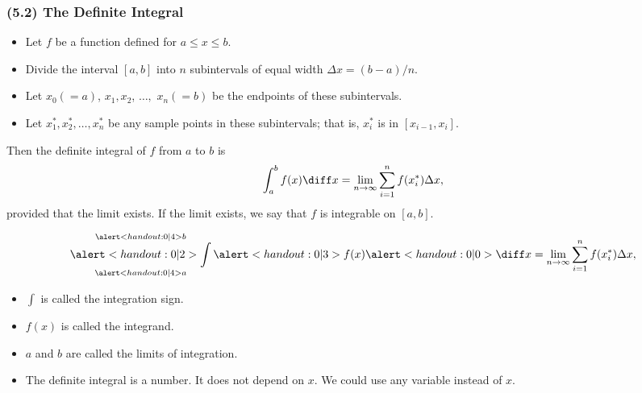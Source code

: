 \begin{frame}\frametitle{(5.2) The Definite Integral}
\begin{definition}
\begin{itemize}
\item  Let $f$ be a function defined for $a\leq x\leq b$.
\item  Divide the interval $[a,b]$ into $n$ subintervals of equal width $\Delta x = (b-a)/n$.  
\item  Let $x_0 (=a)$, $x_1, x_2$, $\ldots ,$ $x_n (=b)$ be the endpoints of these subintervals.
\item  Let $x_1^*, x_2^*, \ldots , x_n^*$ be any sample points in these subintervals; that is, $x_i^*$ is in $[x_{i-1},x_i]$.  
\end{itemize}
Then the definite integral of $f$ from $a$ to $b$ is
\abovedisplayskip=0pt
\belowdisplayskip=0pt
\[
\int_a^b f(x) \diff x = \lim_{n\to \infty} \sum_{i=1}^n f(x_i^*)\Delta x,
\]
provided that the limit exists.  If the limit exists, we say that $f$ is integrable on $[a,b]$.
\end{definition}
\end{frame}

\begin{frame}
\[
\mathop{\alert<handout:0| 2>{\int}}_{\alert<handout:0| 4>{a}}^{\alert<handout:0| 4>{b}} \alert<handout:0| 3>{f(x)} \alert<handout:0| 0>{\diff x} = \lim_{n\to \infty} \sum_{i=1}^n f(x_i^*)\Delta x,
\]
\begin{itemize}
\item<1-| alert@2>  $\int$ is called the integration sign.
\item<1-| alert@3>  $f(x)$ is called the integrand.
\item<1-| alert@4>  $a$ and $b$ are called the limits of integration.
\item<5->  The definite integral is a number.  It does not depend on $x$.  We could use any variable instead of $x$.
\end{itemize}
%
\end{frame}
